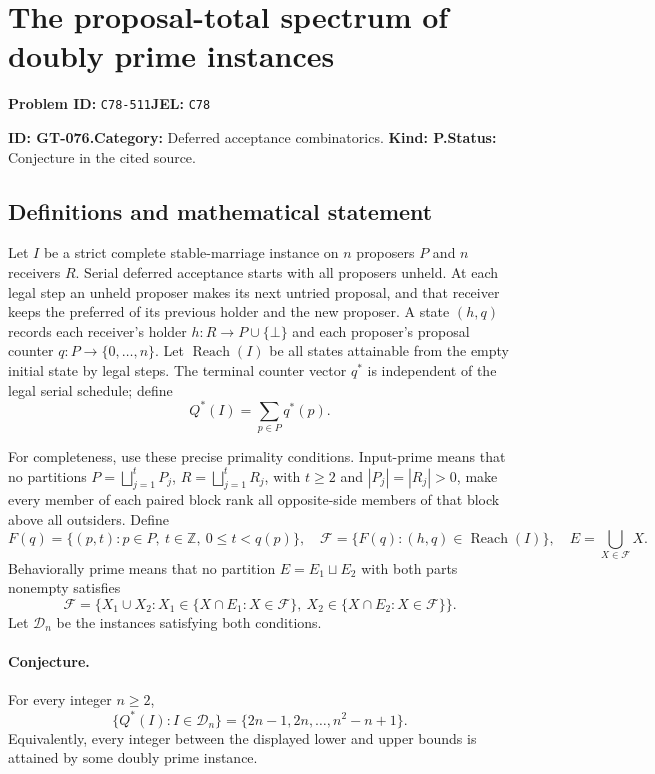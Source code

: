 \documentclass[11pt,a4paper]{article}
\begin{document}
\section*{The proposal-total spectrum of doubly prime instances}
\textbf{Problem ID:} \texttt{C78-511}\quad \textbf{JEL:} \texttt{C78}\par
\label{problem:OP-0206}
\label{game:GT-076}
{\sffamily\small\color{muted}
\noindent\textbf{ID: GT-076.}\quad\textbf{Category:} Deferred acceptance combinatorics.
\quad\textbf{Kind: P.}\quad\textbf{Status:} Conjecture in the cited source.
\par}
\subsection*{Definitions and mathematical statement}
Let \(I\) be a strict complete stable-marriage instance on \(n\)
proposers \(P\) and \(n\) receivers \(R\). Serial deferred acceptance
starts with all proposers unheld. At each legal step an unheld proposer
makes its next untried proposal, and that receiver keeps the preferred
of its previous holder and the new proposer.
A state \((h,q)\) records each receiver's holder
\(h:R\to P\cup\{\bot\}\) and each proposer's proposal counter
\(q:P\to\{0,\ldots,n\}\). Let \(\operatorname{Reach}(I)\) be all states
attainable from the empty initial state by legal steps.
The terminal counter vector \(q^\ast\) is independent of the legal
serial schedule; define
\[
                         Q^\ast(I)=\sum_{p\in P}q^\ast(p).
\]

For completeness, use these precise primality conditions.
Input-prime means that no partitions
\(P=\bigsqcup_{j=1}^t P_j\), \(R=\bigsqcup_{j=1}^t R_j\),
with \(t\geq2\) and \(|P_j|=|R_j|>0\), make every member of each
paired block rank all opposite-side members of that block above
all outsiders. Define
\[
 F(q)=\{(p,t):p\in P,\ t\in\mathbb Z,\ 0\leq t<q(p)\},\quad
 \mathcal F=\{F(q):(h,q)\in\operatorname{Reach}(I)\},\quad
 E=\bigcup_{X\in\mathcal F}X.
\]
Behaviorally prime means that no partition \(E=E_1\sqcup E_2\)
with both parts nonempty satisfies
\[
 \mathcal F=
 \{X_1\cup X_2:
       X_1\in\{X\cap E_1:X\in\mathcal F\},
       \ X_2\in\{X\cap E_2:X\in\mathcal F\}\}.
\]
Let \(\mathcal D_n\) be the instances satisfying both conditions.

\paragraph{Conjecture.}
For every integer \(n\geq 2\),
\[
 \{Q^\ast(I):I\in\mathcal D_n\}
   =\{2n-1,2n,\ldots,n^2-n+1\}.
\]
Equivalently, every integer between the displayed lower and upper
bounds is attained by some doubly prime instance.
\end{document}
